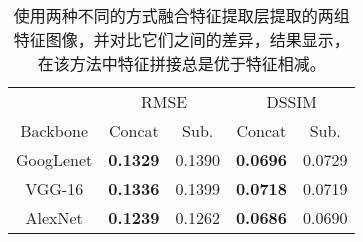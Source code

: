 \begin{table}[t]
    \centering
    \caption[特征融合方式对光照估计的影响]{
    \label{table:fusion-method}
    使用两种不同的方式融合特征提取层提取的两组特征图像，并对比它们之间的差异，结果显示，在该方法中特征拼接总是优于特征相减。
    }
    \begin{tabular}{c|cc|cc} 
     \hline
        ~&\multicolumn{2}{c|}{RMSE}&\multicolumn{2}{c}{DSSIM}\\
        Backbone & Concat & Sub. & Concat &Sub.\\
    \hline
    GoogLenet & \textbf{0.1329} & 0.1390 & \textbf{0.0696} & 0.0729 \\ \hline
    VGG-16    & \textbf{0.1336} & 0.1399 & \textbf{0.0718} & 0.0719 \\ \hline
    AlexNet   & \textbf{0.1239} & 0.1262 & \textbf{0.0686} & 0.0690 \\ \hline
    \end{tabular}
\end{table}


